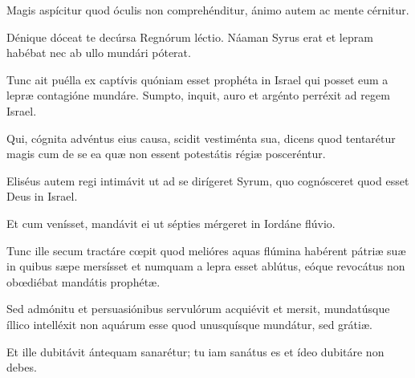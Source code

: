 {\noindent Magis aspícitur quod óculis non comprehénditur, ánimo autem ac mente cérnitur.

\noindent Dénique dóceat te decúrsa Regnórum léctio. Náaman Syrus erat et lepram habébat nec ab ullo mundári póterat. 

\noindent Tunc ait puélla ex captívis quóniam esset prophéta in Israel qui posset eum a lepræ contagióne mundáre. Sumpto, inquit, auro et argénto perréxit ad regem Israel. 

\noindent Qui, cógnita advéntus eius causa, scidit vestiménta sua, dicens quod tentarétur magis cum de se ea quæ non essent potestátis régiæ posceréntur. 

\noindent Eliséus autem regi intimávit ut ad se dirígeret Syrum, quo cognósceret quod esset Deus in Israel. 

\noindent Et cum venísset, mandávit ei ut sépties mérgeret in Iordáne flúvio. 

\noindent Tunc ille secum tractáre cœpit quod melióres aquas flúmina habérent pátriæ suæ in quibus sæpe mersísset et numquam a lepra esset ablútus, eóque revocátus non obœdiébat mandátis prophétæ. 

\noindent Sed admónitu et persuasiónibus servulórum acquiévit et mersit, mundatúsque íllico intelléxit non aquárum esse quod unusquísque mundátur, sed grátiæ.

\noindent Et ille dubitávit ántequam sanarétur; tu iam sanátus es et ídeo dubitáre non debes.}
\newcommand{\responsoriumiii}{\pars{Responsorium 3.} \scriptura{\Rbardot{} Ps. 76, 20 \Vbardot{} ibid., 19; \textbf{H159}}

\vspace{-5mm}

\responsorium{II}{temporalia/resp-inmariviatua-CROCHU-cumdox.gtex}{}}


